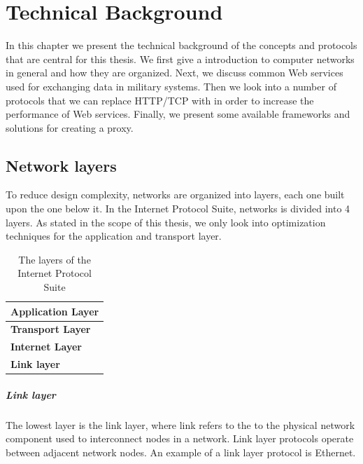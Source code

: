 \chapter{Technical Background}

In this chapter we present the technical background of the concepts and
protocols that are central for this thesis. We first give a introduction to
computer networks in general and how they are organized. Next, we discuss common
Web services used for exchanging data in military systems. Then we look into a
number of protocols that we can replace HTTP/TCP with in order to increase the
performance of Web services. Finally, we present some available frameworks and
solutions for creating a proxy.



\section{Network layers}

To reduce design complexity, networks are organized into layers, each one built
upon the one below it. In the Internet Protocol Suite\cite{rfc-1122}, networks
is divided into 4 layers. As stated in the scope of this thesis, we only look
into optimization techniques for the application and transport layer.

\begin{table}[h]
\begin{tabularx}{\textwidth}{| X |}
\hline
  \textbf{Application Layer} \\ \hline
  \textbf{Transport Layer} \\ \hline
  \textbf{Internet Layer} \\ \hline
  \textbf{Link layer} \\ \hline
\end{tabularx}
\caption{The layers of the Internet Protocol Suite}
\label{figure-network-layers}
\end{table}

\paragraph{Link layer}

The lowest layer is the link layer, where link refers to the to the physical
network component used to interconnect nodes in a network. Link layer protocols
operate between adjacent network nodes. An example of a link layer protocol is
Ethernet.

